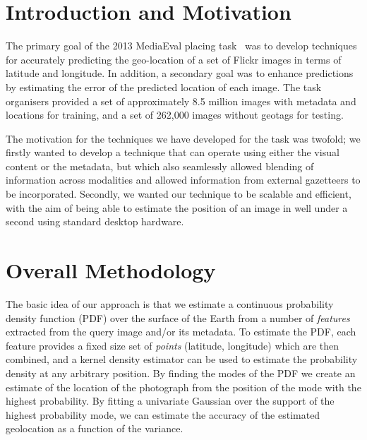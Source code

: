 \documentclass{../acm_proc_article-me11_tweaked}
\begin{document}

\section{Introduction and Motivation}
The primary goal of the 2013 MediaEval placing task~\cite{mediaevalPlacing13} was to develop techniques for accurately predicting the geo-location of a set of Flickr images in terms of latitude and longitude. In addition, a secondary goal was to enhance predictions by estimating the error of the predicted location of each image. The task organisers provided a set of approximately 8.5 million images with metadata and locations for training, and a set of 262,000 images without geotags for testing.

The motivation for the techniques we have developed for the task was twofold; we firstly wanted to develop a technique that can operate using either the visual content or the metadata, but which also seamlessly allowed blending of information across modalities and allowed information from external gazetteers to be incorporated. Secondly, we wanted our technique to be scalable and efficient, with the aim of being able to estimate the position of an image in well under a second using standard desktop hardware.

\section{Overall Methodology}\label{sec:meth}
The basic idea of our approach is that we estimate a continuous probability density function (PDF) over the surface of the Earth from a number of \emph{features} extracted from the query image and/or its metadata. To estimate the PDF, each feature provides a fixed size set of \emph{points} (latitude, longitude) which are then combined, and a kernel density estimator can be used to estimate the probability density at any arbitrary position. By finding the modes of the PDF we create an estimate of the location of the photograph from the position of the mode with the highest probability. By fitting a univariate Gaussian over the support of the highest probability mode, we can estimate the accuracy of the estimated geolocation as a function of the variance.

\end{document}
